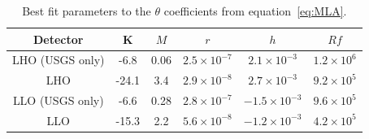 \documentclass[reprint, prl, aps, showpacs]{revtex4-1}
\begin{document}
\begin{table}[]
\centering
\label{table:MLAfit}
\begin{tabular}{|c|c|c|c|c|c|}
\hline
Detector & K & $M$ & $r$ & $h$ & $Rf$  \\ \hline
LHO (USGS only) & -6.8 & 0.06 & $2.5 \times 10^{-7}$ & $2.1 \times 10^{-3}$ & $1.2 \times 10^{6}$ \\ \hline
LHO & -24.1 & 3.4 & $2.9 \times 10^{-8}$ & $2.7 \times 10^{-3}$ & $9.2 \times 10^{5}$ \\ \hline
LLO (USGS only) & -6.6 & 0.28 & $2.8 \times 10^{-7}$ & $-1.5 \times 10^{-3}$ & $9.6 \times 10^{5}$ \\ \hline
LLO & -15.3 & 2.2 & $5.6 \times 10^{-8}$ & $-1.2 \times 10^{-3}$ & $4.2 \times 10^{5}$\\ \hline
\end{tabular}
\caption{Best fit parameters to the $\theta$ coefficients from equation~\ref{eq:MLA}.}
\end{table}
	
\end{document}

